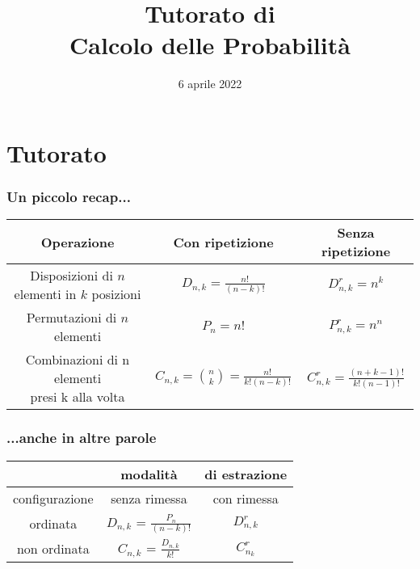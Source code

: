 \documentclass{beamer}
\title[Tutorato Probabilità]
{Tutorato di\\Calcolo delle Probabilità}
\author[DISI]{%
	\texorpdfstring{%
		\begin{columns}
			\column{.50\linewidth}
			\centering
			Camilla Righetti
			\column{.50\linewidth}
			\centering
			Matteo Franzil
		\end{columns}
	}{DISI}
}
\institute[UniTN]{
	\texorpdfstring{%
		\texttt{[image: drawable/logos/logo-disi.png]}
	}{University of Trento}\\
	\smallskip
	Corso di Laurea in Ingegneria Informatica, delle Comunicazioni ed Elettronica
}
\date[06/04/2022]{6 aprile 2022}
\begin{document}
\frame{\titlepage}

\section{Tutorato}

\begin{frame}[fragile]
	\frametitle{Un piccolo recap...}

	\begin{center}
		\begin{tabular}{|ccc|}
			\hline
			Operazione                   & Con ripetizione & Senza ripetizione \\ \hline
			\makecell{Disposizioni di                                          \\$n$ elementi\\in $k$ posizioni} & $D_{n,k} = \frac{n!}{(n-k)!}$ & $D^r_{n,k} = n^k$ \\
			Permutazioni di $n$ elementi & $P_n = n!$      & $P^r_{n,k} = n^n$ \\
			\makecell{Combinazioni di n elementi                               \\presi k alla volta} & $C_{n,k} = \binom{n}{k} = \frac{n!}{k!(n-k)!}$ & $C^r_{n,k} = \frac{(n+k-1)!}{k!(n-1)!}$ \\ \hline
		\end{tabular}
	\end{center}

\end{frame}

\begin{frame}[fragile]
	\frametitle{...anche in altre parole}

	\begin{center}

		\begin{tabular}{|ccc|}
			\hline
			               & modalità                           & di estrazione \\ \hline
			configurazione & senza rimessa                      & con rimessa   \\ \hline
			ordinata       & $D_{n, k}$ = $\frac{P_n}{(n-k)!}$  & $D^r_{n, k}$  \\
			non ordinata   & $C_{n, k}$ = $\frac{D_{n, k}}{k!}$ & $C^r_{n_k}$   \\ \hline
		\end{tabular}
	\end{center}

\end{frame}
\end{document}

